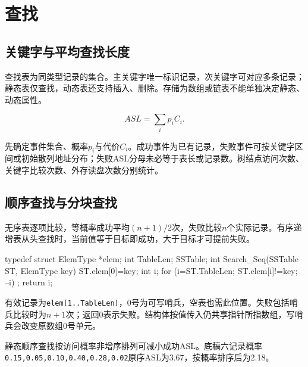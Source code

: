 \chapter{查找}\label{DS07}

\section{关键字与平均查找长度}\label{DS07-definition}

查找表为同类型记录的集合。主关键字唯一标识记录，次关键字可对应多条记录；静态表仅查找，动态表还支持插入、删除。存储为数组或链表不能单独决定静态、动态属性。

\[ASL=\sum_i p_iC_i.\]

先确定事件集合、概率\(p_i\)与代价\(C_i\)。成功事件为已有记录，失败事件可按关键字区间或初始散列地址分布；失败ASL分母未必等于表长或记录数。树结点访问次数、关键字比较次数、外存读盘次数分别统计。

\section{顺序查找与分块查找}\label{DS07-sequential}

无序表逐项比较，等概率成功平均\((n+1)/2\)次，失败比较\(n\)个实际记录。有序递增表从头查找时，当前值等于目标即成功，大于目标才可提前失败。

\par\smallskip\noindent\begin{minipage}{\linewidth}
\begin{codeblock}[language={C++}]
typedef struct {
    ElemType *elem;
    int TableLen;
} SSTable;
int Search_Seq(SSTable ST, ElemType key) {
    ST.elem[0]=key;
    int i;
    for (i=ST.TableLen; ST.elem[i]!=key; --i) ;
    return i;
}
\end{codeblock}
\end{minipage}\par\smallskip

有效记录为\texttt{elem[\allowbreak{}1.\allowbreak{}.\allowbreak{}TableLen]\allowbreak{}}，0号为可写哨兵，空表也需此位置。失败包括哨兵比较时为\(n+1\)次；返回0表示失败。结构体按值传入仍共享指针所指数组，写哨兵会改变原数组0号单元。

静态顺序查找按访问概率非增序排列可减小成功ASL。底稿六记录概率\texttt{0.\allowbreak{}15,\allowbreak{}0.\allowbreak{}05,\allowbreak{}0.\allowbreak{}10,\allowbreak{}0.\allowbreak{}40,\allowbreak{}0.\allowbreak{}28,\allowbreak{}0.\allowbreak{}02}原序ASL为3.67，按概率排序后为2.18。

